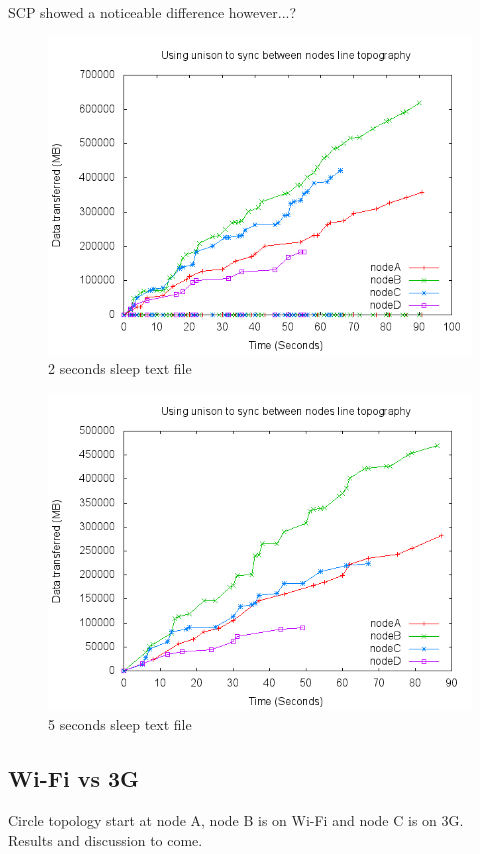 \documentclass[12pt]{article}
\begin{document}
SCP showed a noticeable difference however...?

\begin{figure}[htp]
    \centering
    \includegraphics[scale=0.5]{images/rand-txt-2sleep.png}
    \caption{2 seconds sleep text file}
    \label{fig:2sleep_graph}
\end{figure}

\begin{figure}[htp]
    \centering
    \includegraphics[scale=0.5]{images/5sleep-bad.png}
    \caption{5 seconds sleep text file}
    \label{fig:5sleep_graph}
\end{figure}
\newpage


\subsection{Wi-Fi vs 3G}
Circle topology start at node A, node B is on Wi-Fi and node C is on 3G.
Results and discussion to come.
\end{document}
